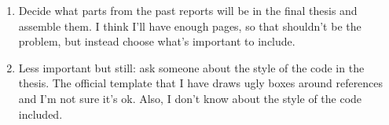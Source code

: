 \begin{enumerate}
  \item Decide what parts from the past reports will be in the final thesis and
  assemble them. I think I'll have enough pages, so that shouldn't be the
  problem, but instead choose what's important to include.

  \item Less important but still: ask someone about the style of the code in the
  thesis. The official template that I have draws ugly boxes around references
  and I'm not sure it's ok. Also, I don't know about the style of the code
  included.

\end{enumerate}
